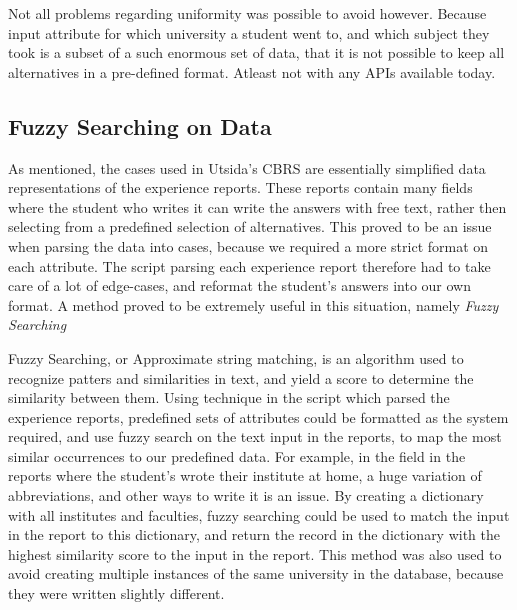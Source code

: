 Not all problems regarding uniformity was possible to avoid however. Because input attribute for which university a student went to, and which subject they took is a subset of a such enormous set of data, that it is not possible to keep all alternatives in a pre-defined format. Atleast not with any APIs available today.

\subsection{Fuzzy Searching on Data}
As mentioned, the cases used in Utsida's CBRS are essentially simplified data representations of the experience reports. These reports contain many fields where the student who writes it can write the answers with free text, rather then selecting from a predefined selection of alternatives. This proved to be an issue when parsing the data into cases, because we required a more strict format on each attribute. The script parsing each experience report therefore had to take care of a lot of edge-cases, and reformat the student's answers into our own format. A method proved to be extremely useful in this situation, namely \emph{Fuzzy Searching}

Fuzzy Searching, or Approximate string matching, is an algorithm used to recognize patters and similarities in text, and yield a score to determine the similarity between them. Using technique in the script which parsed the experience reports, predefined sets of attributes could be formatted as the system required, and use fuzzy search on the text input in the reports, to map the most similar occurrences to our predefined data. For example, in the field in the reports where the student's wrote their institute at home, a huge variation of abbreviations, and other ways to write it is an issue. By creating a dictionary with all institutes and faculties, fuzzy searching could be used to match the input in the report to this dictionary, and return the record in the dictionary with the highest similarity score to the input in the report. This method was also used to avoid creating multiple instances of the same university in the database, because they were written slightly different.

\cleardoublepage